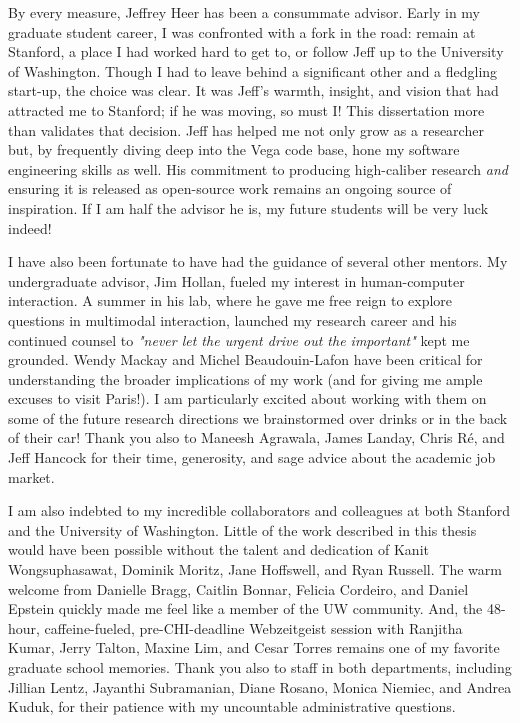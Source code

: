 \label{sec:acknowledgements}

By every measure, Jeffrey Heer has been a consummate advisor. Early in my
graduate student career, I was confronted with a fork in the road: remain at
Stanford, a place I had worked hard to get to, or follow Jeff up to the
University of Washington. Though I had to leave behind a significant other and a
fledgling start-up, the choice was clear. It was Jeff's warmth, insight, and
vision that had attracted me to Stanford; if he was moving, so must I! This
dissertation more than validates that decision. Jeff has helped me not only grow
as a researcher but, by frequently diving deep into the Vega code base, hone my
software engineering skills as well. His commitment to producing high-caliber
research \emph{and} ensuring it is released as open-source work remains an
ongoing source of inspiration. If I am half the advisor he is, my future
students will be very luck indeed!

I have also been fortunate to have had the guidance of several other mentors. My
undergraduate advisor, Jim Hollan, fueled my interest in human-computer
interaction. A summer in his lab, where he gave me free reign to explore
questions in multimodal interaction, launched my research career and his
continued counsel to \emph{"never let the urgent drive out the important"} kept
me grounded. Wendy Mackay and Michel Beaudouin-Lafon have been critical for
understanding the broader implications of my work (and for giving me ample
excuses to visit Paris!). I am particularly excited about working with them on
some of the future research directions we brainstormed over drinks or in the
back of their car! Thank you also to Maneesh Agrawala, James Landay, Chris
R\'{e}, and Jeff Hancock for their time, generosity, and sage advice about the
academic job market.

I am also indebted to my incredible collaborators and colleagues at both
Stanford and the University of Washington. Little of the work described in this
thesis would have been possible without the talent and dedication of Kanit
Wongsuphasawat, Dominik Moritz, Jane Hoffswell, and Ryan Russell. The warm
welcome from Danielle Bragg, Caitlin Bonnar, Felicia Cordeiro, and Daniel
Epstein quickly made me feel like a member of the UW community. And, the
48-hour, caffeine-fueled, pre-CHI-deadline Webzeitgeist session with Ranjitha
Kumar, Jerry Talton, Maxine Lim, and Cesar Torres remains one of my favorite
graduate school memories. Thank you also to staff in both departments, including
Jillian Lentz, Jayanthi Subramanian, Diane Rosano, Monica Niemiec, and Andrea
Kuduk, for their patience with my uncountable administrative questions.


